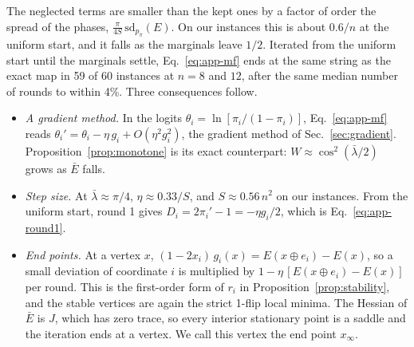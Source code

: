 The neglected terms are smaller than the kept ones by a factor of order the spread of the phases, $\frac{\pi}{4S}\,\mathrm{sd}_{p_\pi}(E)$. On our instances this is about $0.6/n$ at the uniform start, and it falls as the marginals leave $1/2$. Iterated from the uniform start until the marginals settle, Eq.~\eqref{eq:app-mf} ends at the same string as the exact map in 59 of 60 instances at $n=8$ and $12$, after the same median number of rounds to within 4\%. Three consequences follow.
\begin{itemize}
\item \emph{A gradient method.} In the logits $\theta_i=\ln[\pi_i/(1-\pi_i)]$, Eq.~\eqref{eq:app-mf} reads $\theta_i'=\theta_i-\eta\,g_i+O(\eta^2g_i^2)$, the gradient method of Sec.~\ref{sec:gradient}. Proposition~\ref{prop:monotone} is its exact counterpart: $W\approx\cos^2(\bar\lambda/2)$ grows as $\bar E$ falls.
\item \emph{Step size.} At $\bar\lambda\approx\pi/4$, $\eta\approx0.33/S$, and $S\approx0.56\,n^2$ on our instances. From the uniform start, round 1 gives $D_i=2\pi_i'-1=-\eta g_i/2$, which is Eq.~\eqref{eq:app-round1}.
\item \emph{End points.} At a vertex $x$, $(1-2x_i)\,g_i(x)=E(x\oplus e_i)-E(x)$, so a small deviation of coordinate $i$ is multiplied by $1-\eta\,[E(x\oplus e_i)-E(x)]$ per round. This is the first-order form of $r_i$ in Proposition~\ref{prop:stability}, and the stable vertices are again the strict 1-flip local minima. The Hessian of $\bar E$ is $J$, which has zero trace, so every interior stationary point is a saddle and the iteration ends at a vertex. We call this vertex the end point $x_\infty$.
\end{itemize}

